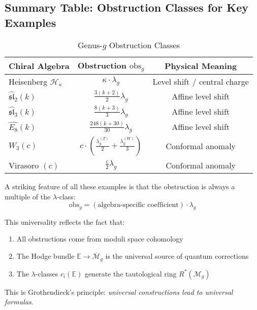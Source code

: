 \subsection{Summary Table: Obstruction Classes for Key Examples}
\label{subsec:obstruction-summary-table}

\begin{table}[h]
\centering
\caption{Genus-$g$ Obstruction Classes}
\label{tab:obstruction-summary}
\begin{tabular}{|l|c|c|}
\hline
\textbf{Chiral Algebra} & \textbf{Obstruction $\text{obs}_g$} & \textbf{Physical Meaning} \\
\hline
Heisenberg $\mathcal{H}_\kappa$ & $\kappa \cdot \lambda_g$ & Level shift / central charge \\
\hline
$\widehat{\mathfrak{sl}}_2(k)$ & $\frac{3(k+2)}{2} \lambda_g$ & Affine level shift \\
\hline
$\widehat{\mathfrak{sl}}_3(k)$ & $\frac{8(k+3)}{3} \lambda_g$ & Affine level shift \\
\hline
$\widehat{E_8}(k)$ & $\frac{248(k+30)}{30} \lambda_g$ & Affine level shift \\
\hline
$W_3(c)$ & $c \cdot (\frac{\lambda_g^{(T)}}{2} + \frac{\lambda_g^{(W)}}{3})$ & 
Conformal anomaly \\
\hline
Virasoro $(c)$ & $\frac{c}{2} \lambda_g$ & Conformal anomaly \\
\hline
\end{tabular}
\end{table}

\begin{remark}\label{rem:lambda-universality}
A striking feature of all these examples is that the obstruction is always a multiple 
of the $\lambda$-class:
$$\text{obs}_g = (\text{algebra-specific coefficient}) \cdot \lambda_g$$

This universality reflects the fact that:
\begin{enumerate}
\item All obstructions come from moduli space cohomology
\item The Hodge bundle $\mathbb{E} \to \overline{\mathcal{M}}_g$ is the universal 
source of quantum corrections
\item The $\lambda$-classes $c_i(\mathbb{E})$ generate the tautological ring 
$R^*(\mathcal{M}_g)$
\end{enumerate}

This is Grothendieck's principle: \textit{universal constructions lead to universal formulas}.
\end{remark}

